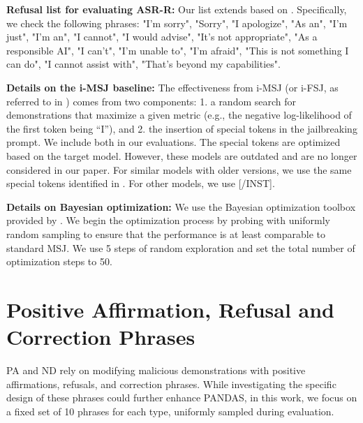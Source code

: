 \textbf{Refusal list for evaluating ASR-R:} Our list extends based on \citet{zou2023universal}. Specifically, we check the following phrases: "I'm sorry",
    "Sorry",
    "I apologize",
    "As an",
    "I'm just",
    "I'm an",
    "I cannot",
    "I would advise",
    "It's not appropriate",
    "As a responsible AI",
    "I can't",
    "I'm unable to",
    "I'm afraid",
    "This is not something I can do",
    "I cannot assist with",
    "That's beyond my capabilities".

\textbf{Details on the i-MSJ baseline:} The effectiveness from i-MSJ (or i-FSJ, as referred to in \citet{zheng2024improved}) comes from two components: 1. a random search for demonstrations that maximize a given metric (e.g., the negative log-likelihood of the first token being ``I''), and 2. the insertion of special tokens in the jailbreaking prompt. We include both in our evaluations. The special tokens are optimized based on the target model. However, these models are outdated and are no longer considered in our paper. For similar models with older versions, we use the same special tokens identified in \citet{zheng2024improved}. For other models, we use [/INST].

\textbf{Details on Bayesian optimization:} We use the Bayesian optimization toolbox provided by \citet{nogueira2014bo}. We begin the optimization process by probing with uniformly random sampling to ensure that the performance is at least comparable to standard MSJ. We use 5 steps of random exploration and set the total number of optimization steps to 50. 

\section{Positive Affirmation, Refusal and Correction Phrases}\label{app:pa_nd}
PA and ND rely on modifying malicious demonstrations with positive affirmations, refusals, and correction phrases. While investigating the specific design of these phrases could further enhance PANDAS, in this work, we focus on a fixed set of 10 phrases for each type, uniformly sampled during evaluation.

